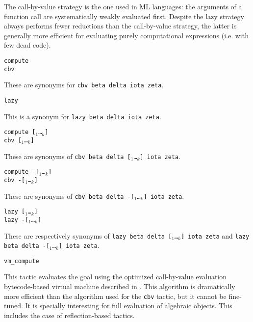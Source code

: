 \begin{coq_example*}
The call-by-value strategy is the one used in ML languages: the
arguments of a function call are systematically weakly evaluated
first. Despite the lazy strategy always performs fewer reductions than
the call-by-value strategy, the latter is generally more efficient for
evaluating purely computational expressions (i.e. with few dead code).

\begin{Variants}
\item {\tt compute} \\
      {\tt cbv}

  These are synonyms for {\tt cbv beta delta iota zeta}.

\item {\tt lazy}

  This is a synonym for {\tt lazy beta delta iota zeta}.

\item {\tt compute [\qualid$_1$\ldots\qualid$_k$]}\\
      {\tt cbv [\qualid$_1$\ldots\qualid$_k$]}

  These are synonyms of {\tt cbv beta delta
  [\qualid$_1$\ldots\qualid$_k$] iota zeta}.

\item {\tt compute -[\qualid$_1$\ldots\qualid$_k$]}\\
      {\tt cbv -[\qualid$_1$\ldots\qualid$_k$]}

  These are synonyms of {\tt cbv beta delta
  -[\qualid$_1$\ldots\qualid$_k$] iota zeta}.

\item {\tt lazy [\qualid$_1$\ldots\qualid$_k$]}\\
      {\tt lazy -[\qualid$_1$\ldots\qualid$_k$]}

  These are respectively synonyms of {\tt lazy beta delta
  [\qualid$_1$\ldots\qualid$_k$] iota zeta} and {\tt lazy beta delta
  -[\qualid$_1$\ldots\qualid$_k$] iota zeta}.

\item {\tt vm\_compute} 

  This tactic evaluates the goal using the optimized call-by-value evaluation
  bytecode-based virtual machine described in
  \cite{CompiledStrongReduction}. This algorithm is dramatically more efficient
  than the algorithm used for the {\tt cbv} tactic, but it cannot be
  fine-tuned. It is specially interesting for full evaluation of algebraic
  objects. This includes the case of reflection-based tactics.


\end{Variants}
\end{coq_example*}
